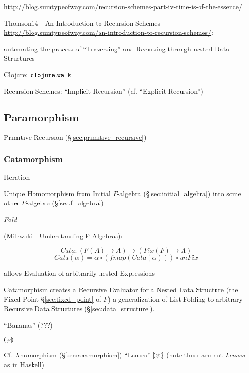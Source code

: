 \url{http://blog.sumtypeofway.com/recursion-schemes-part-iv-time-is-of-the-essence/}

Thomson14 - An Introduction to Recursion Schemes -
\url{http://blog.sumtypeofway.com/an-introduction-to-recursion-schemes/}:

automating the process of ``Traversing'' and Recursing through nested
Data Structures

Clojure: $\mathtt{clojure.walk}$

Recursion Schemes: ``Implicit Recursion'' (cf. ``Explicit Recursion'')



\subsection{Paramorphism}\label{sec:paramorphism}

Primitive Recursion (\S\ref{sec:primitive_recursive})



\subsubsection{Catamorphism}\label{sec:catamorphism}

Iteration

Unique Homomorphism from Initial $F$-algebra
(\S\ref{sec:initial_algebra}) into some other $F$-algebra
(\S\ref{sec:f_algebra})

\emph{Fold}

(Milewski - Understanding F-Algebras):

\[
  Cata : (F (A) \rightarrow A) \rightarrow (Fix (F) \rightarrow A)
\]\[
  Cata (\alpha) = \alpha \circ (fmap (Cata (\alpha))) \circ unFix
\]

allows Evaluation of arbitrarily nested Expressions

Catamorphism creates a Recursive Evaluator for a Nested Data Structure
(the Fixed Point \S\ref{sec:fixed_point} of $F$) a generalization of
List Folding to arbitrary Recursive Data Structures
(\S\ref{sec:data_structure}).

``Bananas'' (???) %

$\llparenthesis \varphi \rrparenthesis$

\fist Cf. Anamorphism (\S\ref{sec:anamorphism}) ``Lenses'' $[\kern-1.95pt(
\psi )\kern-2.0pt]$ (note these are not \emph{Lenses} as in Haskell)



